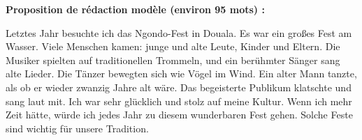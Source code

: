 \documentclass[11pt]{article}
\begin{document}
\begin{corrige}
\textbf{Proposition de rédaction modèle (environ 95 mots) :}

\begin{textebox}
Letztes Jahr besuchte ich das Ngondo-Fest in Douala. Es war ein großes Fest am Wasser. Viele Menschen kamen: junge und alte Leute, Kinder und Eltern. Die Musiker spielten auf traditionellen Trommeln, und ein berühmter Sänger sang alte Lieder. Die Tänzer bewegten sich wie Vögel im Wind. Ein alter Mann tanzte, als ob er wieder zwanzig Jahre alt wäre. Das begeisterte Publikum klatschte und sang laut mit. Ich war sehr glücklich und stolz auf meine Kultur. Wenn ich mehr Zeit hätte, würde ich jedes Jahr zu diesem wunderbaren Fest gehen. Solche Feste sind wichtig für unsere Tradition.
\end{textebox}


\end{corrige}
\end{document}
